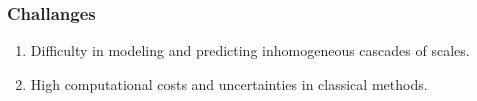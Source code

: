 \begin{frame}
  \frametitle{Challanges}
  \begin{block}{}
    \begin{enumerate}
      \item Difficulty in modeling and predicting inhomogeneous cascades of scales.
      \item High computational costs and uncertainties in classical methods.
    \end{enumerate}    
  \end{block}
\end{frame}


